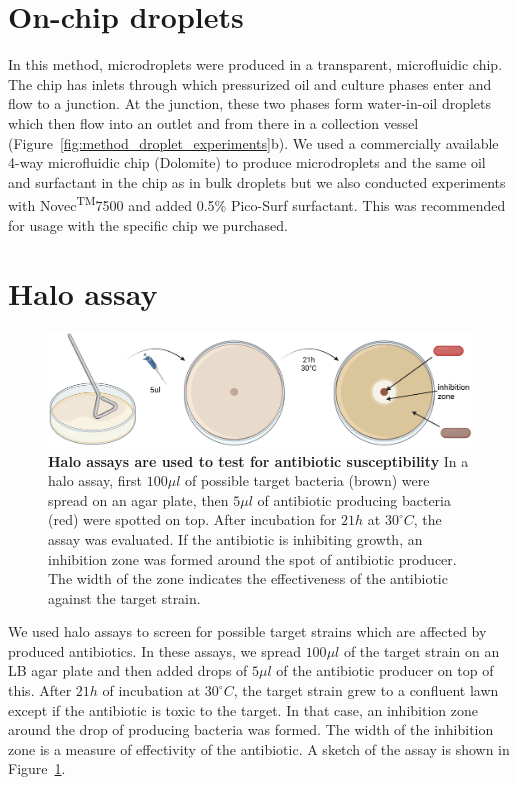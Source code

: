 \section{On-chip droplets}
\label{sec:method_chip_droplets}
In this method, microdroplets were produced in a transparent, microfluidic chip. The chip has inlets through which pressurized oil and culture phases enter and flow to a junction. At the junction, these two phases form water-in-oil droplets which then flow into an outlet and from there in a collection vessel (Figure~\ref{fig:method_droplet_experiments}b). We used a commercially available 4-way microfluidic chip (Dolomite) to produce microdroplets and the same oil and surfactant in the chip as in bulk droplets but we also conducted experiments with Novec\textsuperscript{TM}7500 and added 0.5\% Pico-Surf{\textregistered} surfactant. This was recommended for usage with the specific chip we purchased.

\section{Halo assay}
\begin{figure}
\centering
\includegraphics[width=\linewidth]{graphics/2025_09_30_droplets_fig3.png}
\caption{\textbf{Halo assays are used to test for antibiotic susceptibility} In a halo assay, first $100 \mu l$ of possible target bacteria (brown) were spread on an agar plate, then $5 \mu l$ of antibiotic producing bacteria (red) were spotted on top. After incubation for $21h$ at $30^\circ C$, the assay was evaluated. If the antibiotic is inhibiting growth, an inhibition zone was formed around the spot of antibiotic producer. The width of the zone indicates the effectiveness of the antibiotic against the target strain.}
\label{fig:method_halo_assay}
\end{figure}
We used halo assays to screen for possible target strains which are affected by produced antibiotics. In these assays, we spread $100\mu l$ of the target strain on an LB agar plate and then added drops of $5\mu l$ of the antibiotic producer on top of this. After $21h$ of incubation at $30^\circ C$, the target strain grew to a confluent lawn except if the antibiotic is toxic to the target. In that case, an inhibition zone around the drop of producing bacteria was formed. The width of the inhibition zone is a measure of effectivity of the antibiotic. A sketch of the assay is shown in Figure~\ref{fig:method_halo_assay}.

